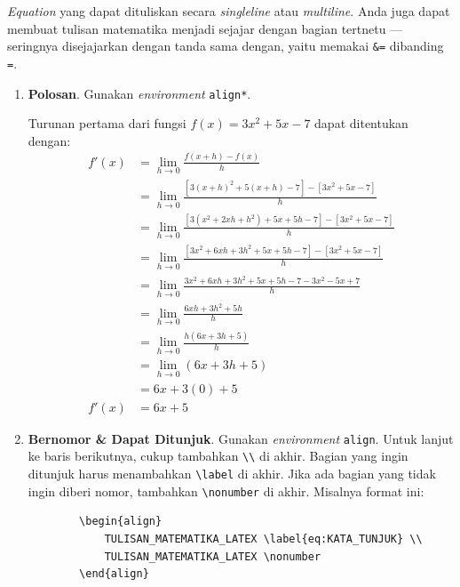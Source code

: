 \textit{Equation} yang dapat dituliskan secara \textit{singleline} atau \textit{multiline}. Anda juga dapat membuat tulisan matematika menjadi sejajar dengan bagian tertnetu --- seringnya disejajarkan dengan tanda sama dengan, yaitu memakai \verb|&=| dibanding \texttt{=}.

\begin{enumerate}[label=\arabic*)]
    \item \textbf{Polosan}. Gunakan \textit{environment} \texttt{align*}.
    
    Turunan pertama dari fungsi $f(x) = 3x^2 + 5x − 7$ dapat ditentukan dengan:
    \begin{align*}
        f'(x) &= \lim_{h \to 0} \frac{f(x+h) - f(x)}{h} \\
        &= \lim_{h \to 0} \frac{[3(x+h)^2 + 5(x+h) - 7] - [3x^2 + 5x - 7]}{h} \\
        &= \lim_{h \to 0} \frac{[3(x^2 + 2xh + h^2) + 5x + 5h - 7] - [3x^2 + 5x - 7]}{h} \\
        &= \lim_{h \to 0} \frac{[3x^2 + 6xh + 3h^2 + 5x + 5h - 7] - [3x^2 + 5x - 7]}{h} \\
        &= \lim_{h \to 0} \frac{3x^2 + 6xh + 3h^2 + 5x + 5h - 7 - 3x^2 - 5x + 7}{h} \\
        &= \lim_{h \to 0} \frac{6xh + 3h^2 + 5h}{h} \\
        &= \lim_{h \to 0} \frac{h(6x + 3h + 5)}{h} \\
        &= \lim_{h \to 0} (6x + 3h + 5) \\
        &= 6x + 3(0) + 5 \\
        f'(x) &= 6x + 5
    \end{align*}
    
    \item \textbf{Bernomor \& Dapat Ditunjuk}. Gunakan \textit{environment} \texttt{align}. Untuk lanjut ke baris berikutnya, cukup tambahkan \verb|\\| di akhir. Bagian yang ingin ditunjuk harus menambahkan \verb|\label| di akhir. Jika ada bagian yang tidak ingin diberi nomor, tambahkan \verb|\nonumber| di akhir. Misalnya format ini:
    
    \begin{lstlisting}
        \begin{align}
            TULISAN_MATEMATIKA_LATEX \label{eq:KATA_TUNJUK} \\
            TULISAN_MATEMATIKA_LATEX \nonumber 
        \end{align}    
    \end{lstlisting}
    

\end{enumerate}
